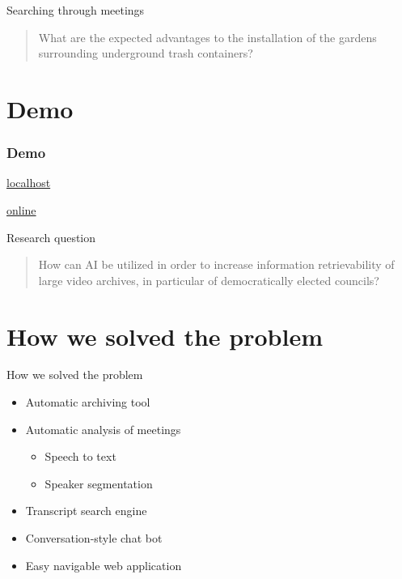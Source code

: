 \documentclass[aspectratio=169,sidebar]{uva-inf-presentation}
\begin{document}
\begin{frame}{Searching through meetings}
    \begin{quote}
        What are the expected advantages to the installation of the gardens surrounding underground trash containers?
    \end{quote}
\end{frame}

\section{Demo}
\begin{frame}\frametitle{Demo}
\href{http://localhost:5173/\#/gemeente/ridderkerk/vergaderingen/2022/986115}{localhost}

\href{https://videotulen.wooverheid.nl/\#/gemeente/ridderkerk/vergaderingen/2022/986115}{online}
\end{frame}

\begin{frame}{Research question}
    \begin{quote}
        How can AI be utilized in order to increase information retrievability of large video archives, in particular of democratically elected councils?
    \end{quote}
\end{frame}

\section{How we solved the problem}
\begin{frame}{How we solved the problem}
    \begin{itemize}
        \item Automatic archiving tool
        \item Automatic analysis of meetings
        \begin{itemize}
            \item Speech to text
            \item Speaker segmentation
        \end{itemize}
        \item Transcript search engine
        \item Conversation-style chat bot
        \item Easy navigable web application
    \end{itemize}
\end{frame}
\end{document}
